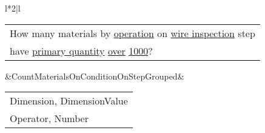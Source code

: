 \begin{tabular}{l*{2}{|l}}
%
{\renewcommand{\arraystretch}{1.0}\begin{tabular}[x]{@{}l@{}}How many materials by \underline{operation} on \underline{wire inspection} step\\have \underline{primary quantity} \underline{over} \underline{1000}?\end{tabular}
}&{CountMaterialsOnConditionOnStepGrouped}&{\renewcommand{\arraystretch}{1.0}\begin{tabular}[x]{@{}l@{}}Dimension, DimensionValue\\Operator, Number\end{tabular}}\\[7pt]
%
\bottomrule
%
\end{tabular}
